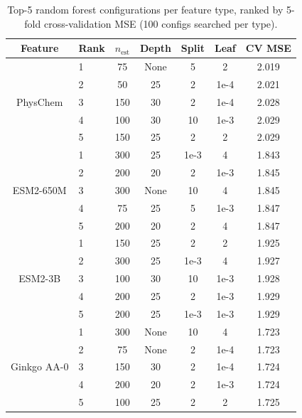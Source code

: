 \documentclass[12pt]{article}
\begin{document}
\begin{table}[H]
\centering
\caption{Top-5 random forest configurations per feature type, ranked by 5-fold cross-validation MSE (100 configs searched per type).}
\label{tab:rf_trials}
\small
\begin{tabular}{clccccc}
\toprule
Feature & Rank & $n_{\text{est}}$ & Depth & Split & Leaf & CV MSE \\
\midrule
\multirow{5}{*}{PhysChem}
 & 1 & 75 & None & 5 & 2 & 2.019 \\
 & 2 & 50 & 25 & 2 & 1e-4 & 2.021 \\
 & 3 & 150 & 30 & 2 & 1e-4 & 2.028 \\
 & 4 & 100 & 30 & 10 & 1e-3 & 2.029 \\
 & 5 & 150 & 25 & 2 & 2 & 2.029 \\
\midrule
\multirow{5}{*}{ESM2-650M}
 & 1 & 300 & 25 & 1e-3 & 4 & 1.843 \\
 & 2 & 200 & 20 & 2 & 1e-3 & 1.845 \\
 & 3 & 300 & None & 10 & 4 & 1.845 \\
 & 4 & 75 & 25 & 5 & 1e-3 & 1.847 \\
 & 5 & 200 & 20 & 2 & 4 & 1.847 \\
\midrule
\multirow{5}{*}{ESM2-3B}
 & 1 & 150 & 25 & 2 & 2 & 1.925 \\
 & 2 & 300 & 25 & 1e-3 & 4 & 1.927 \\
 & 3 & 100 & 30 & 10 & 1e-3 & 1.928 \\
 & 4 & 200 & 25 & 2 & 1e-3 & 1.929 \\
 & 5 & 200 & 25 & 1e-3 & 1e-3 & 1.929 \\
\midrule
\multirow{5}{*}{Ginkgo AA-0}
 & 1 & 300 & None & 10 & 4 & 1.723 \\
 & 2 & 75 & None & 2 & 1e-4 & 1.723 \\
 & 3 & 150 & 30 & 2 & 1e-4 & 1.724 \\
 & 4 & 200 & 20 & 2 & 1e-3 & 1.724 \\
 & 5 & 100 & 25 & 2 & 2 & 1.725 \\
\bottomrule
\end{tabular}
\end{table}
\end{document}
